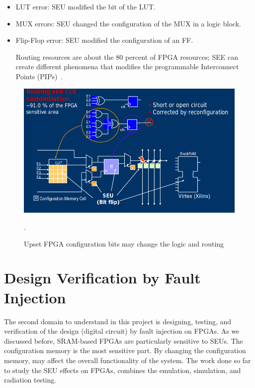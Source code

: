 \begin{itemize}
\item LUT error: SEU modified the bit of the LUT.

\item MUX errors: SEU changed the configuration of the MUX in a logic block.

\item Flip-Flop error: SEU modified the configuration of an FF.

Routing resources are about the 80 percent of FPGA resources; SEE can create different phenomena that modifies the programmable Interconnect Points (PIPs)~\citep{sterpone2006new}.

\end{itemize}



\begin{figure}
 \centering
  \captionsetup{justification=centering}    
   \includegraphics[scale=0.4]{figures/img/seu.png}
   \caption{Upset FPGA configuration bits may change the logic and routing~\citep{manuzzato2010single}}.
\label{fig:seu}
\end{figure}






\section{Design Verification by Fault Injection}




The second domain to understand in this project is designing, testing, and verification of the design (digital circuit) by fault injection on FPGAs. As we discussed before, SRAM-based FPGAs are particularly sensitive to SEUs. The configuration memory is the most sensitive part. By changing the configuration memory, may affect the overall functionality of the system. The work done so far to study the SEU effects on FPGAs, combines the emulation, simulation, and radiation testing.

